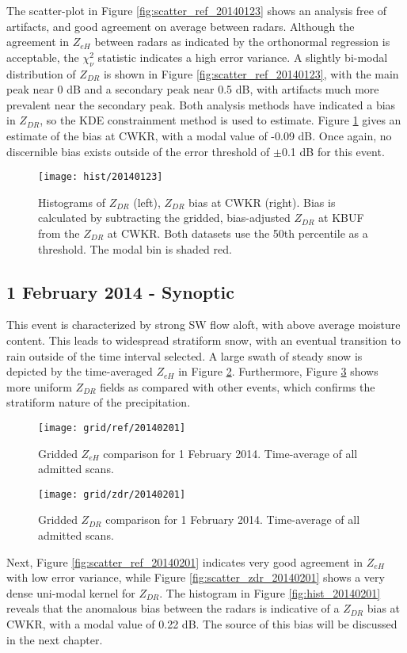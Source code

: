 The scatter-plot in Figure \ref{fig:scatter_ref_20140123} shows an analysis
free of artifacts, and good agreement on average between radars. Although the agreement in $Z_{eH}$ between
radars as indicated by the orthonormal regression is acceptable, the $\chi_\nu^{2}$
statistic indicates a high error variance. A slightly bi-modal distribution of $Z_{DR}$ is shown in 
Figure \ref{fig:scatter_ref_20140123}, with the main peak near 0 dB and a secondary peak near 0.5 dB, with
artifacts much more prevalent near the secondary
peak. Both analysis methods have indicated a bias in $Z_{DR}$, so the
KDE constrainment method is used to estimate. Figure \ref{fig:hist_20140123} gives an estimate of
the bias at CWKR, with a modal value of -0.09 dB. Once again, no discernible bias exists outside of the error
threshold of $\pm$0.1 dB for this event.
\begin{figure}[H]
\texttt{[image: hist/20140123]}\centering
\caption{Histograms of $Z_{DR}$ (left), $Z_{DR}$ bias at CWKR (right). Bias is calculated by subtracting the gridded, bias-adjusted $Z_{DR}$ at KBUF from the
$Z_{DR}$ at CWKR. Both datasets use the 50th percentile as a threshold. The modal bin is shaded red. } 
\label{fig:hist_20140123}
\end{figure}

\subsection{1 February 2014 - Synoptic}
This event is characterized by strong SW flow aloft, with above average moisture content. This leads to
widespread stratiform snow, with an eventual transition to rain outside of the time interval selected.
A large swath of steady snow is depicted by the time-averaged $Z_{eH}$ in Figure \ref{fig:grid_ref_20140201}. 
Furthermore, Figure \ref{fig:grid_zdr_20140201} shows more uniform $Z_{DR}$
fields as compared with other events, which confirms the stratiform nature of the precipitation. 
\begin{figure}[p]
\texttt{[image: grid/ref/20140201]}
\caption{Gridded $Z_{eH}$ comparison for 1 February 2014. Time-average of all admitted scans.} 
\label{fig:grid_ref_20140201}
\end{figure}
\begin{figure}[p]
\texttt{[image: grid/zdr/20140201]}
\caption{Gridded $Z_{DR}$ comparison for 1 February 2014. Time-average of all admitted scans.} 
\label{fig:grid_zdr_20140201}
\end{figure}
Next, Figure \ref{fig:scatter_ref_20140201} indicates very
good agreement in $Z_{eH}$ with low error variance, while Figure \ref{fig:scatter_zdr_20140201} shows a very dense uni-modal kernel for $Z_{DR}$. The
histogram in Figure \ref{fig:hist_20140201} reveals that the anomalous bias between the radars is indicative of a $Z_{DR}$ bias at CWKR, with a modal value
of 0.22 dB. The source of this bias will be discussed in the next chapter.

